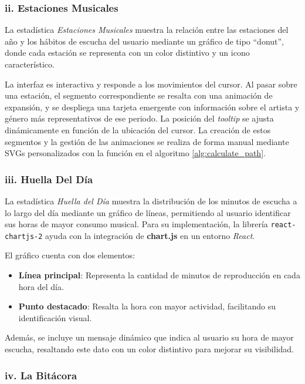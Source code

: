 \subsubsection*{ii. Estaciones Musicales}

La estadística \textit{Estaciones Musicales} muestra la relación entre las estaciones del año y los hábitos de escucha del usuario mediante un gráfico de tipo ``donut'', donde cada estación se representa con un color distintivo y un icono característico.

La interfaz es interactiva y responde a los movimientos del cursor. Al pasar sobre una estación, el segmento correspondiente se resalta con una animación de expansión, y se despliega una tarjeta emergente con información sobre el artista y género más representativos de ese periodo. La posición del \textit{tooltip} se ajusta dinámicamente en función de la ubicación del cursor. La creación de estos segmentos y la gestión de las animaciones se realiza de forma manual mediante SVGs personalizados con la función en el algoritmo \ref{alg:calculate_path}.

\subsubsection*{iii. Huella Del Día}

La estadística \textit{Huella del Día} muestra la distribución de los minutos de escucha a lo largo del día mediante un gráfico de líneas, permitiendo al usuario identificar sus horas de mayor consumo musical. Para su implementación, la librería \texttt{react-chartjs-2} ayuda con la integración de \textbf{chart.js} en un entorno \textit{React}.

El gráfico cuenta con dos elementos:
\begin{itemize}
    \item \textbf{Línea principal}: Representa la cantidad de minutos de reproducción en cada hora del día.
    \item \textbf{Punto destacado}: Resalta la hora con mayor actividad, facilitando su identificación visual.
\end{itemize}

Además, se incluye un mensaje dinámico que indica al usuario su hora de mayor escucha, resaltando este dato con un color distintivo para mejorar su visibilidad.

\subsubsection*{iv. La Bitácora}

